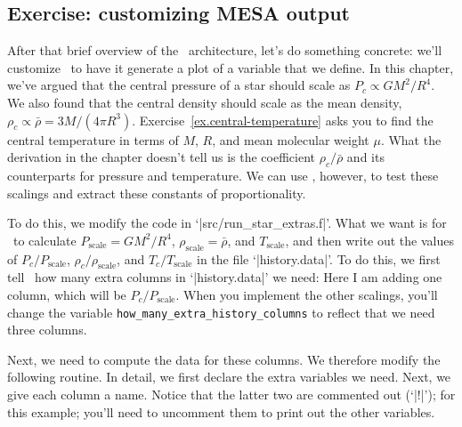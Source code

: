 \subsection{Exercise: customizing MESA output}

After that brief overview of the \mesa\ architecture, let's do something concrete: we'll customize \mesa\ to have it generate a plot of a variable that we define.  In this chapter, we've argued that the central pressure of a star should scale as $P_{c}\propto GM^{2}/R^{4}$. We also found that the central density should scale as the mean density, $\rho_{c}\propto \bar{\rho} = 3M/(4\pi R^{3})$. Exercise~\ref{ex.central-temperature} asks you to find the central temperature in terms of $M$, $R$, and mean molecular weight $\mu$. What the derivation in the chapter doesn't tell us is the coefficient $\rho_{c}/\bar{\rho}$ and its counterparts for pressure and temperature.  We can use \mesa, however, to test these scalings and extract these constants of proportionality.

To do this, we modify the code in `|src/run_star_extras.f|'.  What we want is for \mesa\ to calculate $P_{\mathrm{scale}} = GM^{2}/R^{4}$, $\rho_{\mathrm{scale}} = \bar{\rho}$, and $T_{\mathrm{scale}}$, and then write out the values of $P_{c}/P_{\mathrm{scale}}$, $\rho_{c}/\rho_{\mathrm{scale}}$, and $T_{c}/T_{\mathrm{scale}}$ in the file `|history.data|'. To do this, we first tell \mesa\ how many extra columns in `|history.data|' we need:
Here I am adding one column, which will be $P_{c}/P_{\mathrm{scale}}$.  When you implement the other scalings, you'll change the variable \verb|how_many_extra_history_columns| to reflect that we need three columns.

Next, we need to compute the data for these columns.  We therefore modify the following routine.
In detail, we first declare the extra variables we need.
Next, we give each column a name.
Notice that the latter two are commented out (`|!|'); for this example; you'll need to uncomment them to print out the other variables.

